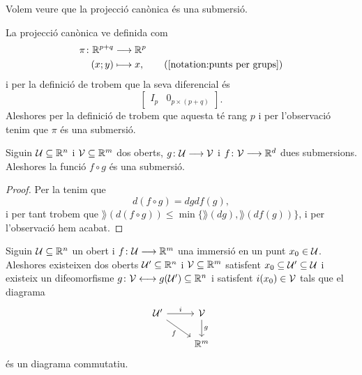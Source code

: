 \documentclass[../Apunts.tex]{subfiles}
\begin{document}
	\begin{example}
		\label{ex:la projecció canònica és una submersió}
		Volem veure que la projecció canònica és una submersió.
	\end{example}
	\begin{solution}
		La projecció canònica ve definida com
		\begin{align*}
			\pi\colon\mathbb{R}^{p+q}&\longrightarrow\mathbb{R}^{p} \\
			(x;y)&\longmapsto x, \tag{\ref{notation:punts per grups}}
		\end{align*}
		i per la definició de  trobem que la seva diferencial és
		\[\left[\begin{array}{c|c}
		I_{p} & 0_{p\times(p+q)}
		\end{array}\right].\]
		Aleshores per la definició de  trobem que aquesta té rang \(p\) i per l'observació  tenim que \(\pi\) és una submersió.
	\end{solution}
	\begin{proposition}
		\label{prop:la composició de submersions és submersió}
		Siguin \(\mathcal{U}\subseteq\mathbb{R}^{n}\) i \(\mathcal{V}\subseteq\mathbb{R}^{m}\) dos oberts, \(g\colon\mathcal{U}\longrightarrow\mathcal{V}\) i \(f\colon\mathcal{V}\longrightarrow\mathbb{R}^{d}\) dues submersions. Aleshores la funció \(f\circ g\) és una submersió.
	\end{proposition}
	\begin{proof}
		Per la  tenim que
		\[d(f\circ g)=dgdf(g),\]
		i per tant trobem que \(\rang(d(f\circ g))\leq\min\{\rang(dg),\rang(df(g))\}\), i per l'observació  hem acabat.
	\end{proof}
	\begin{theorem}
		\label{thm:Teorema d'estructura local de les immersions}
		Siguin \(\mathcal{U}\subseteq\mathbb{R}^{n}\) un obert i \(f\colon\mathcal{U}\longrightarrow\mathbb{R}^{m}\) una immersió en un punt \(x_{0}\in\mathcal{U}\). Aleshores existeixen dos oberts \(\mathcal{U}'\subseteq\mathbb{R}^{n}\) i \(\mathcal{V}\subseteq\mathbb{R}^{m}\) satisfent \(x_{0}\subseteq\mathcal{U}'\subseteq\mathcal{U}\) i existeix un difeomorfisme \(g\colon\mathcal{V}\longleftrightarrow g(\mathcal{U}')\subseteq\mathbb{R}^{n}\) i satisfent \(i(x_{0})\in\mathcal{V}\) tals que el diagrama
		\[\begin{tikzcd}
			\obert{U}' \arrow{r}{i} \arrow[swap]{dr}{f} & \obert{V} \arrow{d}{g} \\
			& \mathbb{R}^{m}
		\end{tikzcd}\]
		és un diagrama commutatiu.
	\end{theorem}
\end{document}
